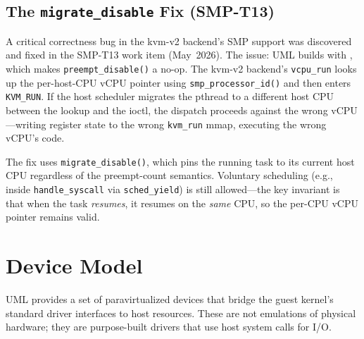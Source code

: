 \subsection{The \texttt{migrate\_disable} Fix (SMP-T13)}
\label{sec:smp-t13}

A critical correctness bug in the kvm-v2 backend's SMP support was discovered
and fixed in the SMP-T13 work item (May~2026).  The issue: UML builds with
, which makes \texttt{preempt\_disable()} a no-op.
The kvm-v2 backend's \texttt{vcpu\_run} looks up the per-host-CPU vCPU pointer
using \texttt{smp\_processor\_id()} and then enters \texttt{KVM\_RUN}.  If the
host scheduler migrates the pthread to a different host CPU between the
lookup and the ioctl, the dispatch proceeds against the wrong vCPU---writing
register state to the wrong \texttt{kvm\_run} mmap, executing the wrong
vCPU's code.

The fix uses \texttt{migrate\_disable()}, which pins the running task to its
current host CPU regardless of the preempt-count semantics.  Voluntary
scheduling (e.g., inside \texttt{handle\_syscall} via \texttt{sched\_yield})
is still allowed---the key invariant is that when the task \emph{resumes}, it
resumes on the \emph{same} CPU, so the per-CPU vCPU pointer remains valid.


\section{Device Model}
\label{sec:device-model}

UML provides a set of paravirtualized devices that bridge the guest kernel's
standard driver interfaces to host resources.  These are not emulations of
physical hardware; they are purpose-built drivers that use host system calls
for I/O.

